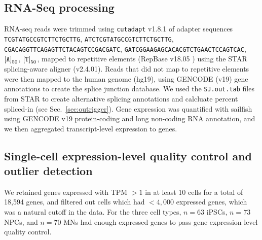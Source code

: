 \subsection{RNA-Seq processing}

RNA-seq reads were trimmed using \texttt{cutadapt} v1.8.1 of adapter sequences \texttt{TCGTATGCCGTCTTCTGCTTG}, \texttt{ATCTCGTATGCCGTCTTCTGCTTG}, \texttt{CGACAGGTTCAGAGTTCTACAGTCCGACGATC}, \texttt{GATCGGAAGAGCACACGTCTGAACTCCAGTCAC}, $\left[\text{\texttt{A}}\right]_{50}$, $\left[\text{\texttt{T}}\right]_{50}$, mapped to repetitive elements (RepBase v18.05 \cite{Jurka:2005tp}) using the STAR\cite{Dobin:2013fg} splicing-aware aligner (v2.4.01). Reads that did not map to repetitive elements were then mapped to the human genome (hg19), using GENCODE\cite{Harrow:2012cx} (v19) gene annotations to create the splice junction database. We used the  \texttt{SJ.out.tab} files from STAR to create alternative splicing annotations and calcluate percent spliced-in (see Sec.~\ref{sec:outrigger}). Gene expression was quantified with sailfish\cite{Patro:2014jd} using GENCODE v19 protein-coding and long non-coding RNA annotation, and we then aggregated transcript-level expression to genes.



\subsection{Single-cell expression-level quality control and outlier detection}

We retained genes expressed with TPM $> 1$ in at least 10 cells for a total of 18,594 genes, and filtered out cells which had $<4,000$ expressed genes, which was a natural cutoff in the data. For the three cell types, $n=63$ iPSCs, $n=73$ NPCs, and $n=70$ MNs had enough expressed genes to pass gene expression level quality control.


